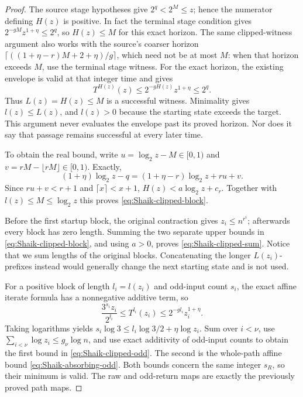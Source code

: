 \begin{proof}
The source stage hypotheses give \(2^q<2^M\le z\); hence the numerator
defining \(H(z)\) is positive. In fact the terminal stage condition gives
\(2^{-gM}z^{1+\eta}\le2^q\), so \(H(z)\le M\) for this exact horizon.
The same clipped-witness argument also works with the source's coarser
horizon \(\lceil((1+\eta-r)M+2+\eta)/g\rceil\), which need not be at most
\(M\): when that horizon exceeds \(M\), use the terminal stage witness.
For the exact horizon, the existing envelope
is valid at that integer time and gives
\[
 T^{H(z)}(z)\le 2^{-gH(z)}z^{1+\eta}\le2^q .
\]
Thus \(L(z)=H(z)\le M\) is a successful witness. Minimality gives
\(l(z)\le L(z)\), and \(l(z)>0\) because the starting state exceeds
the target. This argument never evaluates the envelope past its
proved horizon. Nor does it say that passage remains successful at
every later time.

To obtain the real bound, write \(u=\log_2z-M\in[0,1)\) and
\(v=rM-\lfloor rM\rfloor\in[0,1)\). Exactly,
\[
 (1+\eta)\log_2z-q
   =(1+\eta-r)\log_2z+ru+v .
\]
Since \(ru+v<r+1\) and \(\lceil x\rceil<x+1\),
\(H(z)<a\log_2z+c_r\). Together with \(l(z)\le M\le\log_2z\)
this proves \eqref{eq:Shaik-clipped-block}.

Before the first startup block, the original contraction gives
\(z_i\le n^{r^i}\); afterwards every block has zero length.
Summing the two separate upper bounds in
\eqref{eq:Shaik-clipped-block}, and using \(a>0\), proves
\eqref{eq:Shaik-clipped-sum}. Notice that we sum lengths of the
original blocks. Concatenating the longer \(L(z_i)\)-prefixes instead
would generally change the next starting state and is not used.

For a positive block of length \(l_i=l(z_i)\) and odd-input count
\(s_i\), the exact affine iterate formula has a nonnegative additive
term, so
\[
 \frac{3^{s_i}z_i}{2^{l_i}}
 \le T^{l_i}(z_i)\le2^{-g l_i}z_i^{1+\eta}.
\]
Taking logarithms yields
\(s_i\log3\le l_i\log3/2+\eta\log z_i\).
Sum over \(i<\nu\), use
\(\sum_{i<\nu}\log z_i\le g_\nu\log n\), and use exact additivity
of odd-input counts to obtain the first bound in
\eqref{eq:Shaik-clipped-odd}. The second is the whole-path affine
bound \eqref{eq:Shaik-absorbing-odd}. Both bounds concern the same
integer \(s_R\), so their minimum is valid. The raw and odd-return
maps are exactly the previously proved path maps.
\end{proof}

